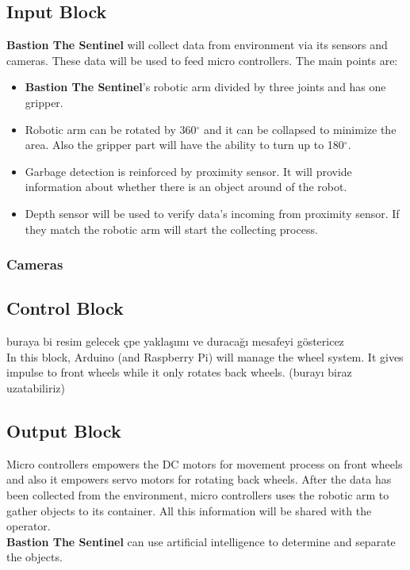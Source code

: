 \documentclass[12pt,a4paper]{article}
\begin{document}
   \subsection{Input Block}
    \begin{flushleft}
     \textbf{Bastion The Sentinel} will collect data from environment via its sensors and cameras. These data will be used to 
     feed micro controllers. The main points are:
     \begin{itemize}
      \item \textbf{Bastion The Sentinel}'s robotic arm divided by three joints and has one gripper.
      \item Robotic arm can be rotated by 360$^{\circ}$ and it can be collapsed to minimize the area. Also the gripper part will 
      have the ability to turn up to 180$^{\circ}$.
      \item Garbage detection is reinforced by proximity sensor. It will provide information about whether there is an object around 
      of the robot.
      \item Depth sensor will be used to verify data's incoming from proximity sensor. If they match the robotic arm will start the 
      collecting process.
     \end{itemize}

    \end{flushleft}

    \subsubsection{Cameras}
     \begin{flushleft}
      
     \end{flushleft}
   \subsection{Control Block}
    \begin{flushleft}
     buraya bi resim gelecek çpe yaklaşımı ve duracağı mesafeyi göstericez\\
     In this block, Arduino (and Raspberry Pi) will manage the wheel system. It gives impulse to front wheels while it only 
     rotates back wheels. (burayı biraz uzatabiliriz)
    \end{flushleft}

   \subsection{Output Block}
    \begin{flushleft}
     Micro controllers empowers the DC motors for movement process on front wheels and also it empowers servo motors for 
     rotating back wheels. After the data has been collected from the environment, micro controllers uses the robotic arm 
     to gather objects to its container. All this information will be shared with the operator.\\
     \textbf{Bastion The Sentinel} can use artificial intelligence to determine and separate the objects.
    \end{flushleft}
\end{document}
